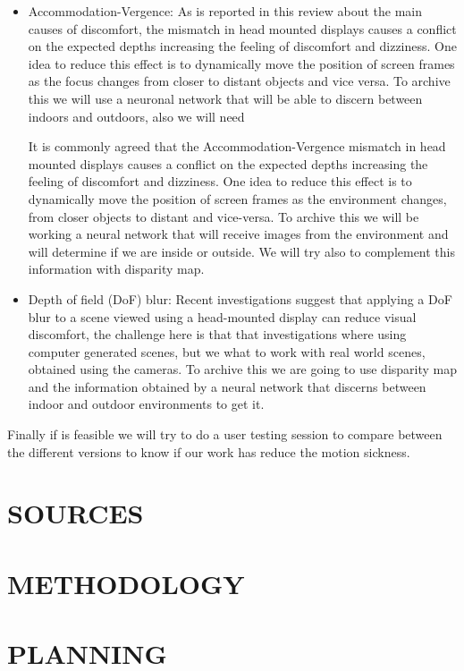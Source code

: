 \documentclass[10pt,a4paper,twocolumn,twoside]{article}
\begin{document}
\begin{itemize}
	\item Accommodation-Vergence: As is reported in this\cite{disconfortReview} review about the main causes of discomfort, the mismatch in head mounted displays causes a conflict on the expected depths increasing the feeling of discomfort and dizziness. One idea to reduce this effect is to dynamically move the position of screen frames as the focus changes from closer to distant objects and vice versa. To archive this we will use a neuronal network that will be able to discern between indoors and outdoors, also we will need 
	
	 It is commonly agreed that the Accommodation-Vergence  mismatch in head mounted displays causes a conflict on the expected depths increasing the feeling of discomfort and dizziness. One idea to reduce this effect is to dynamically move the position of screen frames as the environment changes, from closer objects to distant and vice-versa. To archive this we will be working a neural network that will receive images from the environment and will determine if we are inside or outside. We will try also to complement this information with disparity map.
	
	\item Depth of field (DoF) blur: Recent investigations\cite{ifftConfortDoF} suggest that applying a DoF blur to a scene viewed using a head-mounted display can reduce visual discomfort, the challenge here is that that investigations where using computer generated scenes, but we what to work with real world scenes, obtained using the cameras.
	To archive this we are going to use disparity map and the information obtained by a neural network that discerns between indoor and outdoor environments to get it.  
\end{itemize} 

Finally if is feasible we will try to do a user testing session to compare between the different versions to know if our work has reduce the motion sickness.


\section{SOURCES}

\section{METHODOLOGY}

\section{PLANNING}
\end{document}
